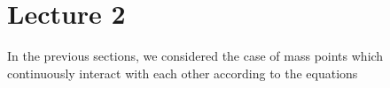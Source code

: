 \section{Lecture 2}
In the previous sections, we considered the case of mass points which continuously interact with each other according to the equations